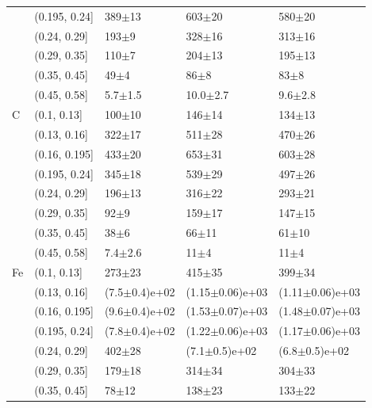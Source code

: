 \begin{table}
\begin{tabular}{lllll}
\rowcol 	& (0.195, 0.24] &           389$\pm$13 &           603$\pm$20 &           580$\pm$20 \\
\rowcol 	& (0.24, 0.29] &            193$\pm$9 &           328$\pm$16 &           313$\pm$16 \\
\rowcol 	& (0.29, 0.35] &            110$\pm$7 &           204$\pm$13 &           195$\pm$13 \\
\rowcol 	& (0.35, 0.45] &             49$\pm$4 &             86$\pm$8 &             83$\pm$8 \\
\rowcol 	& (0.45, 0.58] &          5.7$\pm$1.5 &         10.0$\pm$2.7 &          9.6$\pm$2.8 \\
	C & (0.1, 0.13] &           100$\pm$10 &           146$\pm$14 &           134$\pm$13 \\
	& (0.13, 0.16] &           322$\pm$17 &           511$\pm$28 &           470$\pm$26 \\
	& (0.16, 0.195] &           433$\pm$20 &           653$\pm$31 &           603$\pm$28 \\
	& (0.195, 0.24] &           345$\pm$18 &           539$\pm$29 &           497$\pm$26 \\
	& (0.24, 0.29] &           196$\pm$13 &           316$\pm$22 &           293$\pm$21 \\
	& (0.29, 0.35] &             92$\pm$9 &           159$\pm$17 &           147$\pm$15 \\
	& (0.35, 0.45] &             38$\pm$6 &            66$\pm$11 &            61$\pm$10 \\
	& (0.45, 0.58] &          7.4$\pm$2.6 &             11$\pm$4 &             11$\pm$4 \\
\rowcol 	Fe & (0.1, 0.13] &           273$\pm$23 &           415$\pm$35 &           399$\pm$34 \\
\rowcol 	& (0.13, 0.16] &    (7.5$\pm$0.4)e+02 &  (1.15$\pm$0.06)e+03 &  (1.11$\pm$0.06)e+03 \\
\rowcol 	& (0.16, 0.195] &    (9.6$\pm$0.4)e+02 &  (1.53$\pm$0.07)e+03 &  (1.48$\pm$0.07)e+03 \\
\rowcol 	& (0.195, 0.24] &    (7.8$\pm$0.4)e+02 &  (1.22$\pm$0.06)e+03 &  (1.17$\pm$0.06)e+03 \\
\rowcol 	& (0.24, 0.29] &           402$\pm$28 &    (7.1$\pm$0.5)e+02 &    (6.8$\pm$0.5)e+02 \\
\rowcol 	& (0.29, 0.35] &           179$\pm$18 &           314$\pm$34 &           304$\pm$33 \\
\rowcol 	& (0.35, 0.45] &            78$\pm$12 &           138$\pm$23 &           133$\pm$22 \\

\end{tabular}
\end{table}
